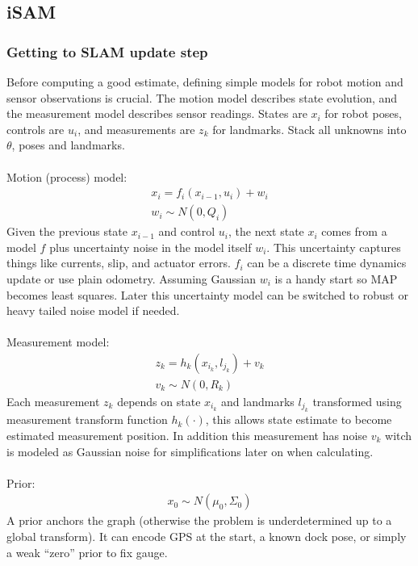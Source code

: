 \subsection{iSAM}
\subsubsection{Getting to SLAM update step}
Before computing a good estimate, defining simple models for robot motion and sensor observations is crucial. The motion model describes state evolution, and the measurement model describes sensor readings. States are $x_i$ for robot poses, controls are $u_i$, and measurements are $z_k$ for landmarks. Stack all unknowns into $\theta$, poses and landmarks.
\\ \\
Motion (process) model:
$$
    \begin{aligned}
        x_i = f_{i}(x_{i-1}, u_i) + w_i \\ 
        w_i \sim N(0, Q_i) \qquad
    \end{aligned}
$$
Given the previous state $x_{i-1}$ and control $u_i$, the next state $x_i$ comes from a model $f$ plus uncertainty noise in the model itself $w_i$. This uncertainty captures things like currents, slip, and actuator errors. $f_i$ can be a discrete time dynamics update or use plain odometry. Assuming Gaussian $w_i$ is a handy start so MAP becomes least squares. Later this uncertainty model can be switched to robust or heavy tailed noise model if needed.
\\ \\
Measurement model:
$$
    \begin{aligned}
        z_k = h_{k}(x_{i_k}, l_{j_k}) + v_k \\ 
        v_k \sim N(0, R_k) \qquad
    \end{aligned}
$$
Each measurement $z_k$ depends on state $x_{i_k}$ and landmarks $l_{j_k}$ transformed using measurement transform function $h_{k}(\cdot)$, this allows state estimate to become estimated measurement position. In addition this measurement has noise $v_k$ witch is modeled as Gaussian noise for simplifications later on when calculating.
\\ \\
Prior:
$$
    \begin{aligned}
        x_0 \sim N(\mu_{0}, \Sigma_{0})
    \end{aligned}
$$
A prior anchors the graph (otherwise the problem is underdetermined up to a global transform). It can encode GPS at the start, a known dock pose, or simply a weak ``zero'' prior to fix gauge.
